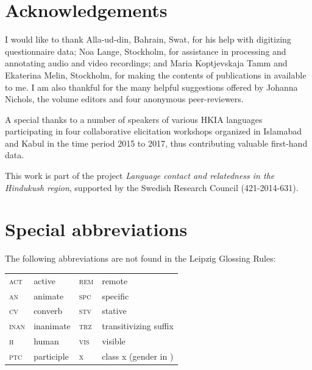 \documentclass[output=collectionpaper]{langsci/langscibook}
\begin{document}
\section*{Acknowledgements}

I would like to thank Alla-ud-din, Bahrain, Swat, for his help with digitizing questionnaire data; Noa Lange, Stockholm, for assistance in processing and annotating audio and video recordings; and Maria Koptjevskaja Tamm and Ekaterina Melin, Stockholm, for making the contents of publications in  available to me. I am also thankful for the many helpful suggestions offered by Johanna Nichols, the volume editors and four anonymous peer-reviewers.

A special thanks to a number of speakers of various HKIA languages participating in four collaborative elicitation workshops organized in Islamabad and Kabul in the time period 2015 to 2017, thus contributing valuable first-hand data.

This work is part of the project \textit{Language contact and relatedness in the Hindukush region}, supported by the Swedish Research Council (421-2014-631).

\section*{Special abbreviations}

\noindent The following abbreviations are not found in the Leipzig Glossing Rules:
\medskip

\begin{tabular}{llll}
\textsc{act} 	&	 active	&	\textsc{rem} 	&	 remote	\\
\textsc{an} 	&	 animate &	\textsc{spc} 	&	 specific\\
\textsc{cv} 	&	 converb &	\textsc{stv} 	&	 stative\\
\textsc{inan} 	&	 inanimate	&	\textsc{trz} 	&	 transitivizing suffix \\
\textsc{h}& human &	\textsc{vis} 	&	 visible	\\
\textsc{ptc} &	 participle & \textsc{x} 	&	 class x (gender in	\ili{Burushaski})	\\
\end{tabular}



\begingroup
\setlength{\emergencystretch}{8em}
\printbibliography[heading=subbibliography,notkeyword=this]
\endgroup
\end{document}
